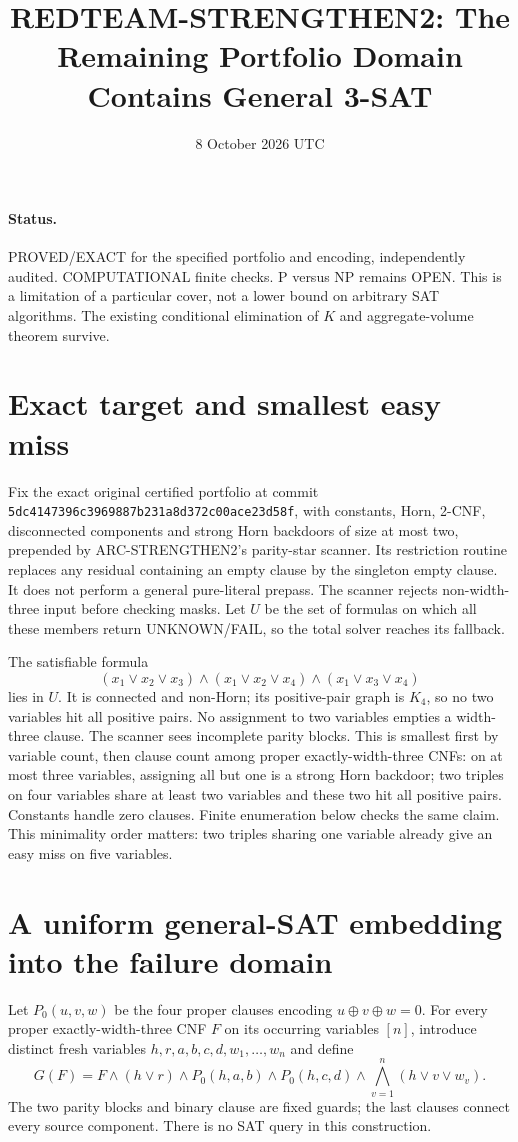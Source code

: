 \documentclass[11pt]{article}
\title{REDTEAM-STRENGTHEN2: The Remaining Portfolio Domain Contains General 3-SAT}
\date{8 October 2026 UTC}
\begin{document}
\sloppy\maketitle
\paragraph{Status.} PROVED/EXACT for the specified portfolio and encoding, independently audited. COMPUTATIONAL finite checks. P versus NP remains OPEN. This is a limitation of a particular cover, not a lower bound on arbitrary SAT algorithms. The existing conditional elimination of $K$ and aggregate-volume theorem survive.

\section{Exact target and smallest easy miss}
Fix the exact original certified portfolio at commit
\nolinkurl{5dc4147396c3969887b231a8d372c00ace23d58f}, with constants,
Horn, 2-CNF, disconnected components and strong Horn backdoors of size
at most two, prepended by ARC-STRENGTHEN2's parity-star scanner.
Its restriction routine replaces any residual containing an empty clause
by the singleton empty clause. It does not perform a general pure-literal
prepass. The scanner rejects non-width-three input before checking masks.
Let $U$ be the set of formulas on which all these members return
UNKNOWN/FAIL, so the total solver reaches its fallback.

The satisfiable formula
\[
 (x_1\vee x_2\vee x_3)\wedge(x_1\vee x_2\vee x_4)
 \wedge(x_1\vee x_3\vee x_4)
\]
lies in $U$. It is connected and non-Horn; its positive-pair graph is
$K_4$, so no two variables hit all positive pairs. No assignment to two
variables empties a width-three clause. The scanner sees incomplete
parity blocks. This is smallest first by variable count, then clause
count among proper exactly-width-three CNFs: on at most three variables,
assigning all but one is a strong Horn backdoor; two triples on four
variables share at least two variables and these two hit all positive
pairs. Constants handle zero clauses. Finite enumeration below checks
the same claim. This minimality order matters: two triples sharing one
variable already give an easy miss on five variables.

\section{A uniform general-SAT embedding into the failure domain}
Let $P_0(u,v,w)$ be the four proper clauses encoding
$u\oplus v\oplus w=0$. For every proper exactly-width-three CNF $F$
on its occurring variables $[n]$, introduce distinct fresh variables
$h,r,a,b,c,d,w_1,\ldots,w_n$ and define
\[
 G(F)=F\wedge(h\vee r)\wedge P_0(h,a,b)\wedge P_0(h,c,d)
       \wedge\bigwedge_{v=1}^{n}(h\vee v\vee w_v).
\]
The two parity blocks and binary clause are fixed guards; the last
clauses connect every source component. There is no SAT query in this
construction.
\end{document}
